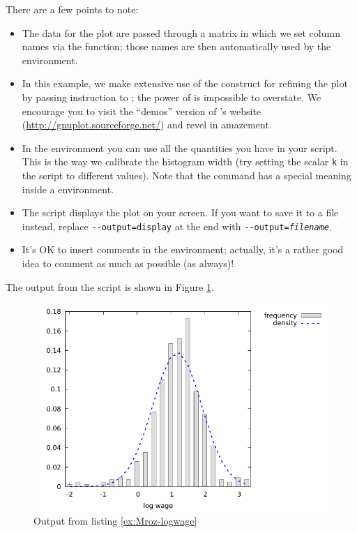 There are a few points to note:
\begin{itemize}
\item The data for the plot are passed through a matrix in which we
  set column names via the  function; those names are
  then automatically used by the  environment.
\item In this example, we make extensive use of the 
  construct for refining the plot by passing instruction to
  ; the power of  is impossible to
  overstate. We encourage you to visit the ``demos'' version of
  's website (\url{http://gnuplot.sourceforge.net/}) and
  revel in amazement.
\item In the  environment you can use all the quantities you
  have in your script. This is the way we calibrate the histogram
  width (try setting the scalar \verb|k| in the script to different
  values). Note that the  command has a special meaning
  inside a  environment.
\item The script displays the plot on your screen. If you want to save
  it to a file instead, replace \verb!--output=display! at the end
  with \texttt{-{}-output=\textsl{filename}}.
\item It's OK to insert comments in the  environment;
  actually, it's a rather good idea to comment as much as possible (as
  always)!
\end{itemize}
The output from the script is shown in Figure \ref{fig:Mroz-logwage}.


\begin{figure}[htbp]
  \centering
  \includegraphics{figures/Mroz-logwage}
  \caption{Output from listing \ref{ex:Mroz-logwage}}
  \label{fig:Mroz-logwage}
\end{figure}

